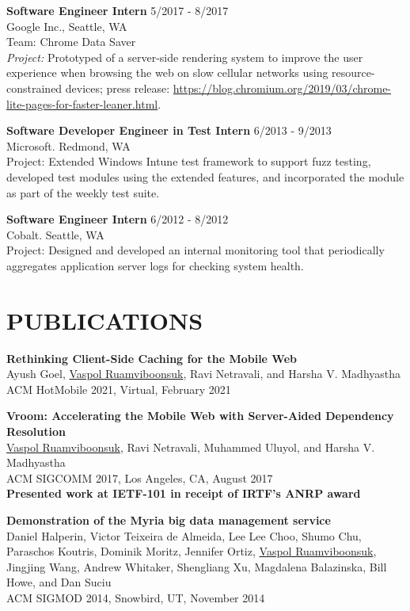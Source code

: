 \documentclass[zhemargin]{res}
\begin{document}
\begin{resume}
    \textbf{Software Engineer Intern} \hfill 5/2017 - 8/2017 \\
    Google Inc., Seattle, WA\\
    Team: Chrome Data Saver \\
    \emph{Project:} Prototyped of a server-side rendering system to improve the
    user experience when browsing the web on slow cellular networks using
    resource-constrained devices; press release:
    \url{https://blog.chromium.org/2019/03/chrome-lite-pages-for-faster-leaner.html}.

    \textbf{Software Developer Engineer in Test Intern} \hfill 6/2013 - 9/2013 \\
    Microsoft. Redmond, WA\\
    Project: Extended Windows Intune test framework to support fuzz testing, developed test modules
    using the extended features, and incorporated the module as part of the weekly test suite.

    \textbf{Software Engineer Intern} \hfill 6/2012 - 8/2012 \\
    Cobalt. Seattle, WA\\
    Project: Designed and developed an internal monitoring tool that periodically aggregates application server logs for checking system health.



\section{\small PUBLICATIONS}
    \textbf{Rethinking Client-Side Caching for the Mobile Web}\\
    Ayush Goel, \underline{Vaspol Ruamviboonsuk}, Ravi Netravali, and Harsha V. Madhyastha\\
    ACM HotMobile 2021, Virtual, February 2021

    \textbf{Vroom: Accelerating the Mobile Web with Server-Aided Dependency Resolution}\\
    \underline{Vaspol Ruamviboonsuk}, Ravi Netravali, Muhammed Uluyol, and Harsha V. Madhyastha\\
    ACM SIGCOMM 2017, Los Angeles, CA, August 2017 \\
    \textbf{Presented work at IETF-101 in receipt of IRTF's ANRP award}

    \textbf{Demonstration of the Myria big data management service}\\
    Daniel Halperin, Victor Teixeira de Almeida, Lee Lee Choo, Shumo Chu, Paraschos Koutris,
    Dominik Moritz, Jennifer Ortiz, \underline{Vaspol Ruamviboonsuk}, Jingjing Wang,
    Andrew Whitaker, Shengliang Xu, Magdalena Balazinska, Bill Howe, and Dan Suciu\\
    ACM SIGMOD 2014, Snowbird, UT, November 2014


\end{resume}
\end{document}

